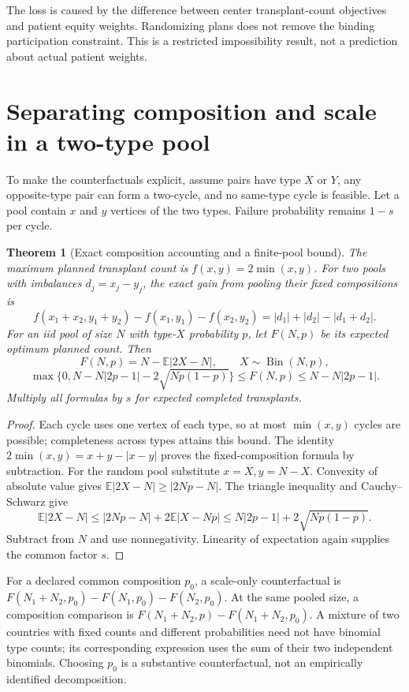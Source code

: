 \documentclass[11pt]{article}
\newtheorem{theorem}{Theorem}
\theoremstyle{remark}
\newcommand{\E}{\mathbb E}
\begin{document}
The loss is caused by the difference between center transplant-count
objectives and patient equity weights. Randomizing plans does not
remove the binding participation constraint. This is a restricted
impossibility result, not a prediction about actual patient weights.

\section{Separating composition and scale in a two-type pool}
To make the counterfactuals explicit, assume pairs have type $X$ or $Y$,
any opposite-type pair can form a two-cycle, and no same-type cycle is
feasible. Let a pool contain $x$ and $y$ vertices of the two types.
Failure probability remains $1-s$ per cycle.

\begin{theorem}[Exact composition accounting and a finite-pool bound]
The maximum planned transplant count is $f(x,y)=2\min(x,y)$.
For two pools with imbalances $d_j=x_j-y_j$, the exact gain from
pooling their fixed compositions is
\[
 f(x_1+x_2,y_1+y_2)-f(x_1,y_1)-f(x_2,y_2)
 =|d_1|+|d_2|-|d_1+d_2|.
\]
For an iid pool of size $N$ with type-$X$ probability $p$, let
$F(N,p)$ be its expected optimum planned count. Then
\[
 F(N,p)=N-\E|2X-N|,\qquad X\sim\operatorname{Bin}(N,p),
\]
\[
 \max\{0,N-N|2p-1|-2\sqrt{Np(1-p)}\}
 \leq F(N,p)\leq N-N|2p-1|.
\]
Multiply all formulas by $s$ for expected completed transplants.
\end{theorem}
\begin{proof}
Each cycle uses one vertex of each type, so at most $\min(x,y)$ cycles
are possible; completeness across types attains this bound. The identity
$2\min(x,y)=x+y-|x-y|$ proves the fixed-composition formula by subtraction.
For the random pool substitute $x=X,y=N-X$. Convexity of absolute value
gives $\E|2X-N|\geq|2Np-N|$. The triangle inequality and
Cauchy--Schwarz give
\[
 \E|2X-N|\leq |2Np-N|+2\E|X-Np|
 \leq N|2p-1|+2\sqrt{Np(1-p)}.
\]
Subtract from $N$ and use nonnegativity. Linearity of expectation again
supplies the common factor $s$.
\end{proof}

For a declared common composition $p_0$, a scale-only counterfactual is
$F(N_1+N_2,p_0)-F(N_1,p_0)-F(N_2,p_0)$. At the same pooled size, a
composition comparison is $F(N_1+N_2,p)-F(N_1+N_2,p_0)$.
A mixture of two countries with fixed counts and different probabilities
need not have binomial type counts; its corresponding expression uses
the sum of their two independent binomials. Choosing $p_0$ is a
substantive counterfactual, not an empirically identified decomposition.
\end{document}

